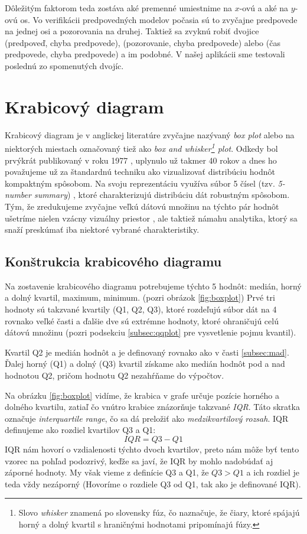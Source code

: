 Dôležitým faktorom teda zostáva aké premenné umiestnime na \mbox{$ x $-ovú} a aké na \mbox{$ y $-ovú} os. Vo verifikácii predpovedných modelov počasia sú to zvyčajne predpovede na jednej osi a pozorovania na druhej. Taktiež sa zvyknú robiť dvojice (predpoveď, chyba predpovede), (pozorovanie, chyba predpovede) alebo (čas predpovede, chyba predpovede) a im podobné. V našej aplikácii sme testovali poslednú zo spomenutých dvojíc.

\section{Krabicový diagram}
\label{sec:boxplot}
Krabicový diagram je v anglickej literatúre zvyčajne nazývaný \textit{box plot} alebo na niektorých miestach označovaný tiež ako \textit{box and whisker\footnote{Slovo \textit{whisker} znamená po slovensky fúz, čo naznačuje, že čiary, ktoré spájajú horný a dolný kvartil s hraničnými hodnotami pripomínajú fúzy.} plot}. Odkedy bol prvýkrát publikovaný v roku 1977 \cite{Tukey}, uplynulo už takmer 40 rokov a dnes ho považujeme už za štandardnú techniku ako vizualizovať distribúciu hodnôt kompaktným spôsobom. Na svoju reprezentáciu využíva súbor 5 čísel (tzv. \textit{\mbox{5-number} summary}) \cite{Potter}, ktoré charakterizujú distribúciu dát robustným spôsobom. Tým, že zredukujeme zvyčajne veľkú dátovú množinu na týchto pár hodnôt ušetríme nielen vzácny vizuálny priestor \cite{Wickham}, ale taktiež námahu analytika, ktorý sa snaží preskúmať iba niektoré vybrané charakteristiky. 

\subsection{Konštrukcia krabicového diagramu}

Na zostavenie krabicového diagramu potrebujeme týchto 5 hodnôt: medián, horný a dolný kvartil, maximum, minimum. (pozri obrázok \ref{fig:boxplot}) Prvé tri hodnoty sú takzvané kvartily (Q1, Q2, Q3), ktoré rozdeľujú súbor dát na 4 rovnako veľké časti a ďalšie dve sú extrémne hodnoty, ktoré ohraničujú celú dátovú množinu (pozri podsekciu \ref{subsec:qqplot} pre vysvetlenie pojmu kvantil). 

Kvartil Q2 je medián hodnôt a je definovaný rovnako ako v časti \ref{subsec:mad}. Ďalej horný (Q1) a dolný (Q3) kvartil získame ako medián hodnôt pod a nad hodnotou Q2, pričom hodnotu Q2 nezahŕňame do výpočtov. 

Na obrázku \ref{fig:boxplot} vidíme, že krabica v grafe určuje pozície horného a dolného kvartilu, zatiaľ čo vnútro krabice znázorňuje takzvané \textit{IQR}. Táto skratka označuje \textit{interquartile range}, čo sa dá preložiť ako \textit{medzikvartilový rozsah}. IQR definujeme ako rozdiel kvartilov Q3 a Q1:
\[
IQR = Q3 - Q1
\]
IQR nám hovorí o vzdialenosti týchto dvoch kvartilov, preto nám môže byť tento vzorec na pohľad podozrivý, keďže sa javí, že IQR by mohlo nadobúdať aj záporné hodnoty. My však vieme z definície Q3 a Q1, že $ Q3 > Q1 $ a ich rozdiel je teda vždy nezáporný (Hovoríme o rozdiele Q3 od Q1, tak ako je definované IQR).

